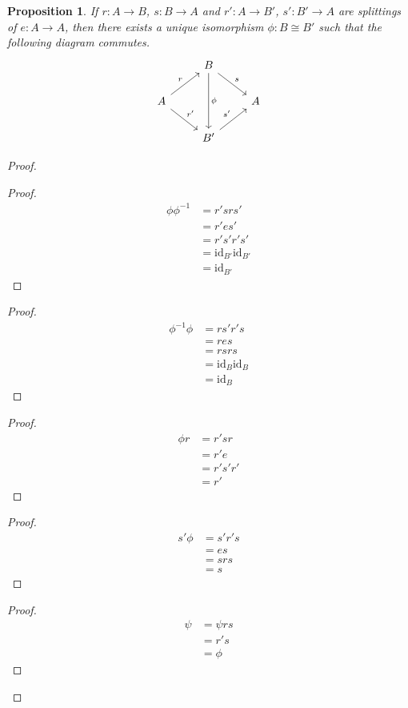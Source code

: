 \documentclass{book}
\let\qed\relax
\newtheorem{prop}{Proposition}[chapter]
\theoremstyle{definition}
\newcommand{\id}[1]{\ensuremath{\mathrm{id}_{#1}}}
\begin{document}
\begin{prop}
If $r : A \rightarrow B$, $s : B \rightarrow A$ and $r' : A \rightarrow B'$, $s' : B' \rightarrow A$ are splittings of $e : A \rightarrow A$, then there exists a unique isomorphism $\phi : B \cong B'$ such that the following diagram commutes.
\[ \begin{tikzcd}
& B \arrow{dd}{\phi} \arrow{dr}{s} \\
A \arrow{ur}{r} \arrow{dr}{r'} & & A\\
& B' \arrow{ur}{s'}
\end{tikzcd} \]
\end{prop}

\begin{proof}
\pf
{}
\step{3}{$\phi \circ \phi^{-1} = \id{B'}$}
\begin{proof}
	\pf
	\begin{align*}
		\phi \phi^{-1} & = r' s r s' \\
		& = r' e s' \\
		& = r' s' r' s' \\
		& = \id{B'} \id{B'} \\
		& = \id{B'}
	\end{align*}
\end{proof}
\step{4}{$\phi^{-1} \circ \phi = \id{B}$}
\begin{proof}
	\pf
	\begin{align*}
		\phi^{-1} \phi & = r s' r' s \\
		& = r e s \\
		& = r s r s \\
		& = \id{B} \id{B} \\
		& = \id{B}
	\end{align*}
\end{proof}
\begin{proof}
	\pf
	\begin{align*}
		\phi r & = r' s r \\
		& = r' e \\
		& = r' s' r' \\
		& = r'
	\end{align*}
\end{proof}
\begin{proof}
	\pf
	\begin{align*}
		s' \phi & = s' r' s \\
		& = e s \\
		& = s r s \\
		& = s
	\end{align*}
\end{proof}
\begin{proof}
	\pf
	\begin{align*}
		\psi & = \psi r s \\
		& = r' s \\
		& = \phi
	\end{align*}
\end{proof}
\qed
\end{proof}
\end{document}
